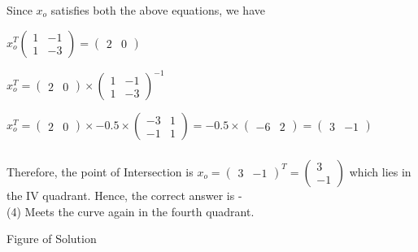 \documentclass{beamer}
\begin{document}
\begin{frame}
\frametitle{}
Since $x_o$ satisfies both the above equations, we have\\
\bigbreak

$x_{o}^T  
\begin{pmatrix} 1 & -1 \\ 1 & -3 \end{pmatrix} =
\begin{pmatrix} 2 & 0 \end{pmatrix} $
\bigbreak

$x_o^T = 
\begin{pmatrix} 2 & 0 \end{pmatrix} \times 
\begin{pmatrix} 1 & -1 \\ 1 & -3 \end{pmatrix}^{-1}$
\bigbreak

$x_{o}^T = 
\begin{pmatrix} 2 & 0 \end{pmatrix} 
\times -0.5 \times 
\begin{pmatrix} -3 & 1 \\ -1 & 1 \end{pmatrix} 
= -0.5 \times 
\begin{pmatrix} -6 & 2 \end{pmatrix} = 
\begin{pmatrix} 3 & -1 \end{pmatrix}$
\end{frame}


\begin{frame}
\frametitle{}
Therefore, the point of Intersection is
\bigbreak
$x_{o} = 
\begin{pmatrix} 3 & -1 \end{pmatrix}^T =
\begin{pmatrix} 3 \\ -1 \end{pmatrix}$
\bigbreak
which lies in the IV quadrant.
\bigbreak
Hence, the correct answer is - \\
(4) Meets the curve again in the fourth quadrant.
\end{frame}


\begin{frame}{Figure of Solution}
\end{frame}
\end{document}
